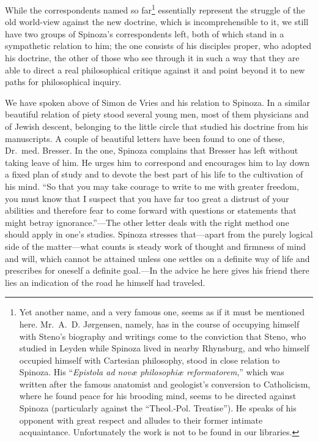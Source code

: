 \documentclass[12pt]{book}
\newcommand{\opage}[1]{\marginnote{\footnotesize\textit{[#1]}}}
\begin{document}
While the correspondents named so far\footnote{Yet another name, and a very famous one,
seems as if it must be mentioned here. Mr.~A.~D. Jørgensen, namely, has in the course
of occupying himself with Steno's biography and writings come to the conviction that
Steno, who studied in Leyden while Spinoza lived in nearby Rhynsburg, and who himself
occupied himself with Cartesian philosophy, stood in close relation to Spinoza. His
``\textit{Epistola ad novæ philosophiæ reformatorem},'' which was written after the
famous anatomist and geologist's conversion to Catholicism, where he found peace for
his brooding mind, seems to be directed against Spinoza (particularly against the
``Theol.-Pol. Treatise''). He speaks of his opponent with great respect and alludes to
their former intimate acquaintance. Unfortunately the work is not to be found in our
libraries.} essentially represent the struggle of the old world-view against the new
doctrine, which is incomprehensible to it, we still have two groups of Spinoza's
correspondents left, both of which stand in a sympathetic relation to him; the one
consists of his disciples proper, who adopted his doctrine, the other of those who see
through it in such a way that they are able to direct a real philosophical critique
against it and point beyond it to new paths for philosophical inquiry.

We have spoken above of Simon de Vries and his relation to Spinoza. In a similar
beautiful relation of piety \opage{64}stood several young men, most of them physicians
and of Jewish descent, belonging to the little circle that studied his doctrine from
his manuscripts. A couple of beautiful letters have been found to one of these,
Dr.~med. Bresser. In the one, Spinoza complains that Bresser has left without taking
leave of him. He urges him to correspond and encourages him to lay down a fixed plan
of study and to devote the best part of his life to the cultivation of his mind. ``So
that you may take courage to write to me with greater freedom, you must know that I
suspect that you have far too great a distrust of your abilities and therefore fear to
come forward with questions or statements that might betray ignorance.''---The other
letter deals with the right method one should apply in one's studies. Spinoza stresses
that---apart from the purely logical side of the matter---what counts is steady work
of thought and firmness of mind and will, which cannot be attained unless one settles
on a definite way of life and prescribes for oneself a definite goal.---In the advice
he here gives his friend there lies an indication of the road he himself had traveled.
\end{document}
